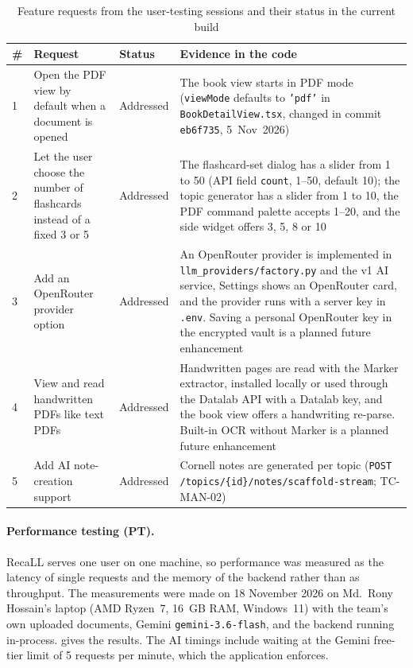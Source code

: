 \begin{table}[!htbp]
\centering
\caption{Feature requests from the user-testing sessions and their status in the current build}\label{tab:uat}
\small\setlength{\tabcolsep}{4pt}
\begin{tabularx}{\textwidth}{@{}l >{\raggedright\arraybackslash}p{} l X@{}}
\toprule
\textbf{\#} & \textbf{Request} & \textbf{Status} & \textbf{Evidence in the code}\\
\midrule
1 & Open the PDF view by default when a document is opened & Addressed & The book view starts in PDF mode
(\texttt{viewMode} defaults to \texttt{'pdf'} in \texttt{BookDetailView.tsx}, changed in commit \texttt{eb6f735},
5~Nov~2026)\\
2 & Let the user choose the number of flashcards instead of a fixed 3 or 5 & Addressed & The flashcard-set dialog has a
slider from 1 to 50 (API field \texttt{count}, 1--50, default 10); the topic generator has a slider from 1 to 10, the
PDF command palette accepts 1--20, and the side widget offers 3, 5, 8 or 10\\
3 & Add an OpenRouter provider option & Addressed & An OpenRouter provider is implemented in
\texttt{llm\_providers/factory.py} and the v1 AI service, Settings shows an OpenRouter card, and the provider runs
with a server key in \texttt{.env}. Saving a personal OpenRouter key in the encrypted vault is a planned future
enhancement\\
4 & View and read handwritten PDFs like text PDFs & Addressed & Handwritten pages are read with the Marker
extractor, installed locally or used through the Datalab API with a Datalab key, and the book view offers a
handwriting re-parse. Built-in OCR without Marker is a planned future enhancement\\
5 & Add AI note-creation support & Addressed & Cornell notes are generated per topic
(\texttt{POST /topics/\{id\}/notes/scaffold-stream}; TC-MAN-02)\\
\bottomrule
\end{tabularx}
\end{table}

\paragraph{Performance testing (PT).} RecaLL serves one user on one machine, so performance was measured as
the latency of single requests and the memory of the backend rather than as throughput. The measurements were
made on 18 November 2026 on Md.\ Rony Hossain's laptop (AMD Ryzen~7, 16~GB RAM, Windows~11) with the team's
own uploaded documents, Gemini \texttt{gemini-3.6-flash}, and the backend running in-process.
 gives the results. The AI timings include waiting at the Gemini free-tier limit of 5 requests
per minute, which the application enforces.

